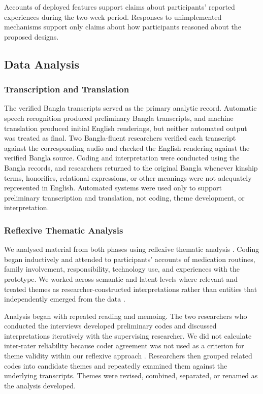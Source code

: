 Accounts of deployed features support claims about participants' reported experiences during the two-week period. Responses to unimplemented mechanisms support only claims about how participants reasoned about the proposed designs.

\subsection{Data Analysis}

\subsubsection{Transcription and Translation}

The verified Bangla transcripts served as the primary analytic record. Automatic speech recognition produced preliminary Bangla transcripts, and machine translation produced initial English renderings, but neither automated output was treated as final. Two Bangla-fluent researchers verified each transcript against the corresponding audio and checked the English rendering against the verified Bangla source. Coding and interpretation were conducted using the Bangla records, and researchers returned to the original Bangla whenever kinship terms, honorifics, relational expressions, or other meanings were not adequately represented in English. Automated systems were used only to support preliminary transcription and translation, not coding, theme development, or interpretation.

\subsubsection{Reflexive Thematic Analysis}

We analysed material from both phases using reflexive thematic analysis \cite{15,16}. Coding began inductively and attended to participants' accounts of medication routines, family involvement, responsibility, technology use, and experiences with the prototype. We worked across semantic and latent levels where relevant and treated themes as researcher-constructed interpretations rather than entities that independently emerged from the data \cite{15,16}.

Analysis began with repeated reading and memoing. The two researchers who conducted the interviews developed preliminary codes and discussed interpretations iteratively with the supervising researcher. We did not calculate inter-rater reliability because coder agreement was not used as a criterion for theme validity within our reflexive approach \cite{16,93}. Researchers then grouped related codes into candidate themes and repeatedly examined them against the underlying transcripts. Themes were revised, combined, separated, or renamed as the analysis developed.

